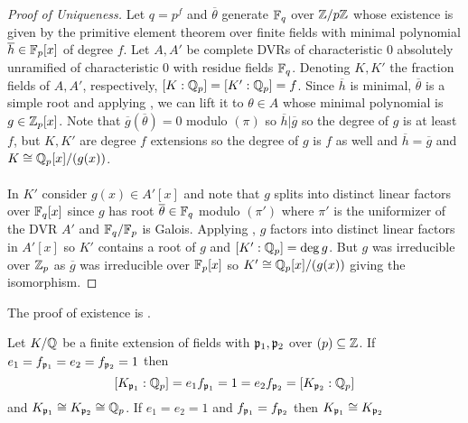 \begin{proof}[Proof of Uniqueness]
  Let $q=p^{f}$ and $\overline{\theta}$ generate $\mathbb{F}_{q}$ over $\mathbb{Z}/p\mathbb{Z}$ whose existence is given by the primitive element theorem over finite fields with minimal polynomial $\overline{h}\in \mathbb{F}_{p}[x]$ of degree $f$. Let $A,A'$ be complete DVRs of characteristic 0 absolutely unramified of characteristic 0 with residue fields $\mathbb{F}_{q}$. Denoting $K,K'$ the fraction fields of $A,A'$, respectively, $[K:\mathbb{Q}_{p}]=[K':\mathbb{Q}_{p}]=f$. Since $\overline{h}$ is minimal, $\overline{\theta}$ is a simple root and applying , we can lift it to $\theta\in A$ whose minimal polynomial is $g\in\mathbb{Z}_{p}[x]$. Note that $\overline{g}(\overline{\theta})=0$ modulo $(\pi)$ so $\overline{h}|\overline{g}$ so the degree of $g$ is at least $f$, but $K,K'$ are degree $f$ extensions so the degree of $g$ is $f$ as well and $\overline{h}=\overline{g}$ and $K\cong \mathbb{Q}_{p}[x]/(g(x))$. \\\\
  In $K'$ consider $g(x)\in A'[x]$ and note that $g$ splits into distinct linear factors over $\mathbb{F}_{q}[x]$ since $g$ has root $\overline{\theta}\in\mathbb{F}_{q}$ modulo $(\pi')$ where $\pi'$ is the uniformizer of the DVR $A'$ and $\mathbb{F}_{q}/\mathbb{F}_{p}$ is Galois. Applying , $g$ factors into distinct linear factors in $A'[x]$ so $K'$ contains a root of $g$ and $[K':\mathbb{Q}_{p}]=\deg g$. But $g$ was irreducible over $\mathbb{Z}_{p}$ as $\overline{g}$ was irreducible over $\mathbb{F}_{p}[x]$ so $K'\cong\mathbb{Q}_{p}[x]/(g(x))$ giving the isomorphism.
\end{proof}
The proof of existence is \cite[Ch. II, \S 5, Thm. 3]{Serre}. 
\begin{example}
  Let $K/\mathbb{Q}$ be a finite extension of fields with $\mathfrak{p}_{1},\mathfrak{p}_{2}$ over $(p)\subseteq\mathbb{Z}$. If $e_{1}=f_{\mathfrak{p}_{1}}=e_{2}=f_{\mathfrak{p}_{2}}=1$ then 
  $$[K_{\mathfrak{p}_{1}}:\mathbb{Q}_{p}]=e_{1}f_{\mathfrak{p}_{1}}=1=e_{2}f_{\mathfrak{p}_{2}}=[K_{\mathfrak{p}_{2}}:\mathbb{Q}_{p}]$$
  and $K_{\mathfrak{p}_{1}}\cong K_{\mathfrak{p}_{2}}\cong\mathbb{Q}_{p}$. If $e_{1}=e_{2}=1$ and $f_{\mathfrak{p}_{1}}=f_{\mathfrak{p}_{2}}$ then $K_{\mathfrak{p}_{1}}\cong K_{\mathfrak{p}_{2}}$
\end{example}